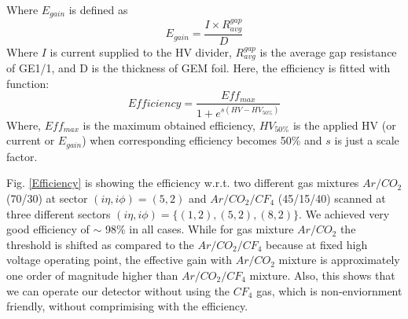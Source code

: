 Where $E_{gain}$ is defined as
\begin{equation}
E_{gain} = \frac{I\times R_{avg}^{gap}}{D}
\end{equation}
Where $I$ is current supplied to the HV divider, $R_{avg}^{gap}$ is the average gap resistance of GE1/1, and D is the thickness of GEM foil.
Here, the efficiency is fitted with function:
\begin{equation}
    Efficiency = \frac{Eff_{max}}{1+e^{s(HV-HV_{50\%})}}
\end{equation}
Where, $Eff_{max}$ is the maximum obtained efficiency, $HV_{50\%}$ is the applied HV (or current or $E_{gain}$) when corresponding efficiency becomes 50\% and $s$ is just a scale factor.

Fig. \ref{Efficiency} is showing the efficiency w.r.t. two different gas mixtures $Ar/CO_2$ (70/30) at sector $(i\eta,i\phi)=(5,2)$ and $Ar/CO_2/CF_4$ (45/15/40) scanned at three different sectors $(i\eta,i\phi)=\{(1,2),(5,2),(8,2)\}$. We achieved very good efficiency of $\sim$ 98\% in all cases. While for gas mixture $Ar/CO_2$ the threshold is shifted as compared to the $Ar/CO_2/CF_4$ because at fixed high voltage operating point, the effective gain with $Ar/CO_2$  mixture is approximately one order of magnitude higher than $Ar/CO_2/CF_4$ mixture. Also, this shows that we can operate our detector without using the $CF_4$ gas, which is non-enviornment friendly, without comprimising with the efficiency.
      

